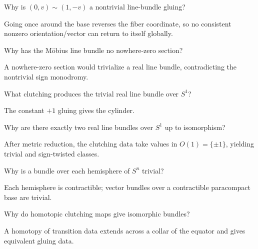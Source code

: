\begin{problem}\label{prob:viii30-04}
Why is \((0,v)\sim(1,-v)\) a nontrivial line-bundle gluing?
\end{problem}
\begin{solution}
Going once around the base reverses the fiber coordinate, so no consistent nonzero orientation/vector can return to itself globally.
\end{solution}

\begin{problem}\label{prob:viii30-05}
Why has the Möbius line bundle no nowhere-zero section?
\end{problem}
\begin{solution}
A nowhere-zero section would trivialize a real line bundle, contradicting the nontrivial sign monodromy.
\end{solution}

\begin{problem}[Cylinder]\label{prob:viii30-06}
What clutching produces the trivial real line bundle over \(S^1\)?
\end{problem}
\begin{solution}
The constant \(+1\) gluing gives the cylinder.
\end{solution}

\begin{problem}\label{prob:viii30-07}
Why are there exactly two real line bundles over \(S^1\) up to isomorphism?
\end{problem}
\begin{solution}
After metric reduction, the clutching data take values in \(O(1)=\{\pm1\}\), yielding trivial and sign-twisted classes.
\end{solution}

\begin{problem}\label{prob:viii30-08}
Why is a bundle over each hemisphere of \(S^n\) trivial?
\end{problem}
\begin{solution}
Each hemisphere is contractible; vector bundles over a contractible paracompact base are trivial.
\end{solution}

\begin{problem}\label{prob:viii30-09}
Why do homotopic clutching maps give isomorphic bundles?
\end{problem}
\begin{solution}
A homotopy of transition data extends across a collar of the equator and gives equivalent gluing data.
\end{solution}

